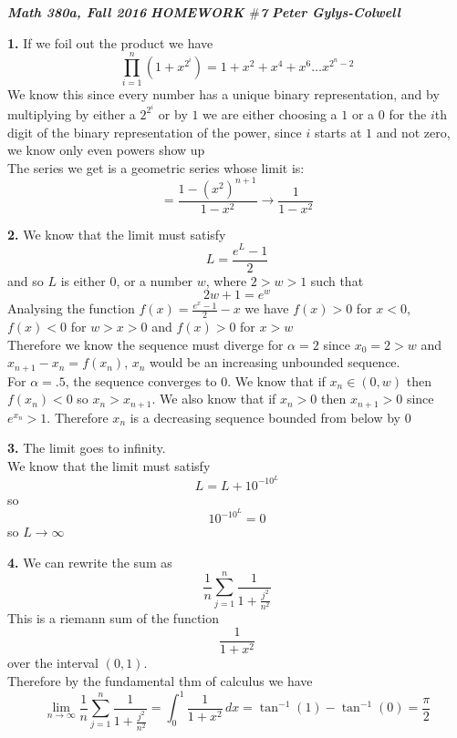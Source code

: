 \documentclass[12pt]{article}
\newenvironment{ques}{\vspace{2 ex}}{\vspace{2 ex}}
\theoremstyle{definition}
\begin{document}
\noindent \textit{\textbf{Math 380a, Fall 2016}} \hspace{1.3cm}
\textit{\textbf{HOMEWORK $\#$7}} \hspace{1.3cm} \textit{\textbf{Peter
Gylys-Colwell}} 

\vspace{1cm}

\begin{ques}
	\textbf{1.} 
		If we foil out the product we have
		$$\prod_{i = 1}^n (1 + x^{2^i}) = 1 + x^2 + x^4 + x^6 \dots x^{2^n - 2}$$
		We know this since every number has a unique binary
		representation, and by multiplying by either a $2^{2^i}$ or by
		$1$ we are either choosing a $1$ or a $0$ for the $i$th digit of
		the binary representation of the power, since $i$ starts at $1$
		and not zero, we know only even powers show up\\
		The series we get is a geometric series whose limit is:
		$$= \frac{1 - (x^2)^{n+1}}{1 - x^2} \to \frac{1}{1 - x^2}$$
\end{ques}

\begin{ques}
	\textbf{2.} 
		We know that the limit must satisfy 
		$$L = \frac{e^L - 1}{2}$$
		and so $L$ is either $0$, or a number $w$, where $2 > w > 1$ such that 
		$$2w + 1 = e^w$$
		Analysing the function $f(x) = \frac{e^{x} - 1}{2} - x$ we
		have $f(x) > 0$ for $x < 0$, $f(x) < 0$ for $w > x > 0$ and
		$f(x) > 0$ for $x >w$\\
		Therefore we know the sequence must diverge for $\alpha = 2$
		since $x_0 = 2 > w$ and $x_{n+1} - x_n = f(x_n)$, $x_n$ would
		be an increasing unbounded sequence.\\
		For $\alpha = .5$, the sequence converges to $0$. We know that
		if $x_n \in (0,w)$ then $f(x_n) < 0$ so $x_n > x_{n+1}$. We
		also know that if $x_n > 0$ then $x_{n+1} > 0$ since $e^{x_n} >
		1$. Therefore $x_n$ is a decreasing sequence bounded from below
		by $0$
\end{ques}

\begin{ques}
	\textbf{3.} 
		The limit goes to infinity.\\
		We know that the limit must satisfy
		$$L = L + 10^{-10^L}$$
		so
		$$10^{-10^L} = 0$$
		so $L \to \infty$
\end{ques}

\begin{ques}
	\textbf{4.} 
		We can rewrite the sum as
		$$\frac{1}{n}\sum_{j=1}^{n}\frac{1}{1 + \frac{j^2}{n^2}}$$
		This is a riemann sum of the function
		$$\frac{1}{1 + x^2}$$
		over the interval $(0, 1)$.\\
		Therefore by the fundamental thm of calculus we have
		$$\lim_{n \to \infty} \frac{1}{n}\sum_{j=1}^{n}\frac{1}{1 +
		\frac{j^2}{n^2}} = \int_0^1 \frac{1}{1 + x^2}\, dx =
		\tan^{-1}(1) - \tan^{-1}(0) = \frac \pi 2$$
\end{ques}
\end{document}
